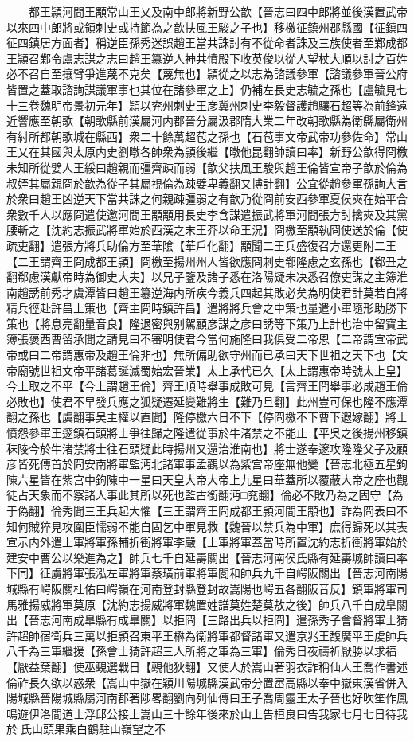 　　都王頴河間王顒常山王乂及南中郎將新野公歆【晉志曰四中郎將並後漢置武帝以來四中郎將或領刺史或持節為之歆扶風王駿之子也】移檄征鎮州郡縣國【征鎮四征四鎮居方面者】稱逆臣孫秀迷誤趙王當共誅討有不從命者誅及三族使者至鄴成都王頴召鄴令盧志謀之志曰趙王簒逆人神共憤殿下收英俊以從人望杖大順以討之百姓必不召自至攘臂爭進蔑不克矣【蔑無也】頴從之以志為諮議參軍【諮議參軍晉公府皆置之蓋取諮詢謀議軍事也其位在諸參軍之上】仍補左長史志毓之孫也【盧毓見七十三卷魏明帝景初元年】頴以兖州刺史王彦冀州刺史李毅督護趙驤石超等為前鋒遠近響應至朝歌【朝歌縣前漢屬河内郡晉分屬汲郡隋大業二年改朝歌縣為衛縣屬衛州有紂所都朝歌城在縣西】衆二十餘萬超苞之孫也【石苞事文帝武帝功參佐命】常山王乂在其國與太原内史劉暾各帥衆為頴後繼【暾他昆翻帥讀曰率】新野公歆得冏檄未知所從嬖人王綏曰趙親而彊齊疎而弱【歆父扶風王駿與趙王倫皆宣帝子歆於倫為叔姪其屬親冏於歆為從子其屬視倫為疎嬖卑義翻又博計翻】公宜從趙參軍孫詢大言於衆曰趙王凶逆天下當共誅之何親疎彊弱之有歆乃從冏前安西參軍夏侯奭在始平合衆數千人以應冏遣使邀河間王顒顒用長史李含謀遣振武將軍河間張方討擒奭及其黨腰斬之【沈約志振武將軍始於西漢之末王莽以命王況】冏檄至顒執冏使送於倫【使疏吏翻】遣張方將兵助倫方至華隂【華戶化翻】顒聞二王兵盛復召方還更附二王【二王謂齊王冏成都王頴】冏檄至揚州州人皆欲應冏刺史郗隆慮之玄孫也【郗丑之翻郗慮漢獻帝時為御史大夫】以兄子鑒及諸子悉在洛陽疑未决悉召僚吏謀之主簿淮南趙誘前秀才虞潭皆曰趙王簒逆海内所疾今義兵四起其敗必矣為明使君計莫若自將精兵徑赴許昌上策也【齊主冏時鎮許昌】遣將將兵會之中策也量遣小軍隨形助勝下策也【將息亮翻量音良】隆退密與别駕顧彦謀之彦曰誘等下策乃上計也治中留寶主簿張褒西曹留承聞之請見曰不審明使君今當何施隆曰我俱受二帝恩【二帝謂宣帝武帝或曰二帝謂惠帝及趙王倫非也】無所偏助欲守州而已承曰天下世祖之天下也【文帝廟號世祖文帝平諸葛誕滅蜀始宏晉業】太上承代已久【太上謂惠帝時號太上皇】今上取之不平【今上謂趙王倫】齊王順時舉事成敗可見【言齊王冏舉事必成趙王倫必敗也】使君不早發兵應之狐疑遷延變難將生【難乃旦翻】此州豈可保也隆不應潭翻之孫也【虞翻事吴主權以直聞】隆停檄六日不下【停冏檄不下曹下遐嫁翻】將士憤怨參軍王邃鎮石頭將士爭往歸之隆遣從事於牛渚禁之不能止【平吳之後揚州移鎮秣陵今於牛渚禁將士往石頭疑此時揚州又還治淮南也】將士遂奉邃攻隆隆父子及顧彦皆死傳首於冏安南將軍監沔北諸軍事孟觀以為紫宫帝座無他變【晉志北極五星鉤陳六星皆在紫宫中鉤陳中一星曰天皇大帝大帝上九星曰華蓋所以覆蔽大帝之座也觀徒占天象而不察諸人事此其所以死也監古銜翻沔□兖翻】倫必不敗乃為之固守【為于偽翻】倫秀聞三王兵起大懼【三王謂齊王冏成都王頴河間王顒也】詐為冏表曰不知何賊猝見攻圍臣懦弱不能自固乞中軍見救【魏晉以禁兵為中軍】庶得歸死以其表宣示内外遣上軍將軍孫輔折衝將軍李嚴【上軍將軍蓋當時所置沈約志折衝將軍始於建安中曹公以樂進為之】帥兵七千自延壽關出【晉志河南侯氏縣有延夀城帥讀曰率下同】征虜將軍張泓左軍將軍蔡璜前軍將軍閭和帥兵九千自崿阪關出【晉志河南陽城縣有崿阪關杜佑曰崿嶺在河南登封縣登封故嵩陽也崿五各翻阪音反】鎮軍將軍司馬雅揚威將軍莫原【沈約志揚威將軍魏置姓譜莫姓楚莫敖之後】帥兵八千自成臯關出【晉志河南成臯縣有成臯關】以拒冏【三路出兵以拒冏】遣孫秀子會督將軍士猗許超帥宿衛兵三萬以拒頴召東平王楙為衛將軍都督諸軍又遣京兆王馥廣平王䖍帥兵八千為三軍繼援【孫會士猗許超三人所將之軍為三軍】倫秀日夜禱祈厭勝以求福【厭益葉翻】使巫覡選戰日【覡他狄翻】又使人於嵩山著羽衣詐稱仙人王喬作書述倫祚長久欲以惑衆【嵩山中嶽在穎川陽城縣漢武帝分置崈高縣以奉中嶽東漢省併入陽城縣晉陽城縣屬河南郡著陟畧翻劉向列仙傳曰王子喬周靈王太子晉也好吹笙作鳳鳴遊伊洛間道士浮邱公接上嵩山三十餘年後來於山上告桓良曰告我家七月七日待我於氏山頭果乘白鶴駐山嶺望之不